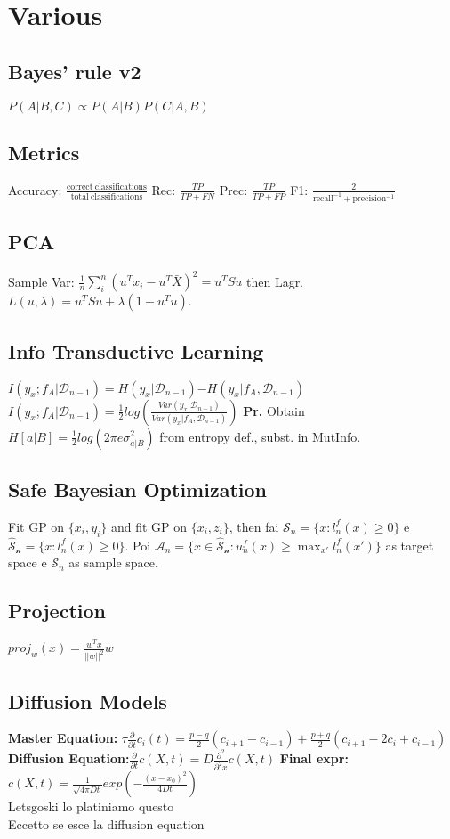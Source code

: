 \section*{Various}
\subsection*{Bayes' rule v2}
$P(A|B, C)\propto P(A|B)P(C|A, B)$

\subsection*{Metrics}
Accuracy: $\frac{\mathrm{correct\ classifications}}{\mathrm{total\ classifications}}$ Rec: $\frac{TP}{TP+FN}$ Prec: $\frac{TP}{TP+FP}$
F1: $\frac{2}{\mathrm{recall}^{-1}+\mathrm{precision^{-1}}}$
\subsection*{PCA}
Sample Var: $\frac 1n \sum_i^n(u^Tx_i-u^T\bar X)^2=u^TSu$ then Lagr. $L(u,\lambda)=u^TSu+\lambda(1{-}u^Tu)$.

\subsection*{Info Transductive Learning}
$I(y_x;f_A|\mathcal D_{n-1})\mathrm{=}H(y_x|\mathcal D_{n-1})\mathrm{-}H(y_x|f_A, \mathcal D_{n-1})$
$I(y_x;f_A|\mathcal D_{n-1})=\frac 12 log(\frac{Var(y_x|\mathcal D_{n-1})}{Var(y_x|f_A,\mathcal D_{n-1})})$ \textbf{Pr.}
Obtain $H[a|B]=\frac 12 log(2\pi e\sigma^2_{a|B})$ from entropy def., subst. in MutInfo.
\subsection*{Safe Bayesian Optimization}
Fit GP on $\{x_i,y_i\}$ and fit GP on $\{x_i,z_i\}$, then fai $\mathcal S_n=\{x:l^f_n(x)\ge 0\}$ e $\mathcal{\hat S_n}=\{x:l^f_n(x)\ge 0\}$. Poi $\mathcal A_n=\{x\in\mathcal{\hat S_n}:u^f_n(x)\ge\max_{x'}l^f_n(x')\}$ as target space e $\mathcal S_n$ as sample space.
\subsection*{Projection}
$proj_w(x)=\frac{w^Tx}{||w||^2}w$
\subsection*{Diffusion Models}
\textbf{Master Equation:} $\tau\frac{\partial}{\partial t}c_i(t)=\frac{p-q}2(c_{i+1} - c_{i-1})+\frac{p+q}2(c_{i+1}-2c_i+c_{i-1})$
\textbf{Diffusion Equation:}$\frac{\partial}{\partial t}c(X,t)=D\frac{\partial^2}{\partial^2x}c(X,t)$
\textbf{Final expr:}$c(X,t)=\frac{1}{\sqrt{4\pi Dt}}exp(-\frac{(x-x_0)^2}{4Dt})$ \\


Letsgoski lo platiniamo questo \\
Eccetto se esce la diffusion equation